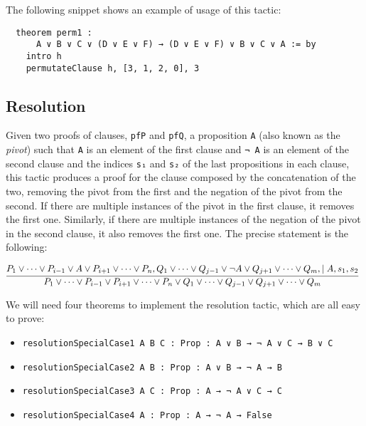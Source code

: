 The following snippet shows an example of usage of this tactic:

\begin{verbatim}
  theorem perm1 :
      A ∨ B ∨ C ∨ (D ∨ E ∨ F) → (D ∨ E ∨ F) ∨ B ∨ C ∨ A := by
    intro h
    permutateClause h, [3, 1, 2, 0], 3
\end{verbatim}



\subsection{Resolution}

Given two proofs of clauses, \texttt{pfP} and \texttt{pfQ}, a proposition \texttt{A}
(also known as the \textit{pivot}) such that
\texttt{A} is an element of the first clause and \texttt{¬ A} is an element of the second clause and the indices \texttt{s₁} and \texttt{s₂} of the last propositions in each clause, this tactic produces a proof for the clause composed by the concatenation
of the two, removing the pivot from the first and the negation of the pivot from the second. If there are multiple instances of the pivot in the first clause, it removes
the first one. Similarly, if there are multiple instances of the negation of the pivot
in the second clause, it also removes the first one. The precise statement
is the following:

\[
  \infer[]{P_{1} \vee \cdots \vee P_{i - 1} \vee P_{i + 1} \vee \cdots \vee P_{n} \vee Q_{1} \vee \cdots \vee Q_{j - 1} \vee Q_{j + 1} \vee \cdots \vee Q_{m}}{P_{1} \vee \cdots \vee P_{i - 1} \vee A \vee P_{i + 1} \vee \cdots \vee P_{n}, Q_{1} \vee \cdots \vee Q_{j - 1} \vee \neg A \vee Q_{j + 1} \vee \cdots \vee Q_{m}, \mid A, s_{1}, s_{2}}
\]

We will need four theorems to implement the resolution tactic, which are all easy to prove:

\begin{itemize}
  \item \texttt{resolutionSpecialCase1 {A B C : Prop} : A ∨ B → ¬ A ∨ C → B ∨ C}
  \item \texttt{resolutionSpecialCase2 {A B : Prop} : A ∨ B → ¬ A → B}
  \item \texttt{resolutionSpecialCase3 {A C : Prop} : A → ¬ A ∨ C → C}
  \item \texttt{resolutionSpecialCase4 {A : Prop} : A → ¬ A → False}
\end{itemize}


